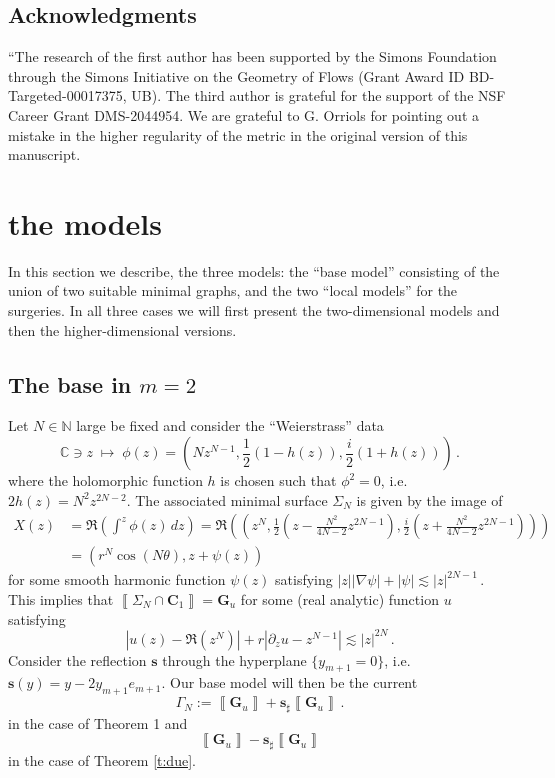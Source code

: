 \documentclass[reqno]{amsart}
\theoremstyle{definition}
\theoremstyle{remark}
\numberwithin{equation}{section}
\newcommand{\R}{\mathbb{R}}
\newcommand{\N}{\mathbb{N}}
\newcommand{\bC}{\mathbf{C}} %
\newcommand{\bG}{\mathbf{G}} %
\def\a#1{\left\llbracket{#1}\right\rrbracket}
\begin{document}
\subsection{Acknowledgments} ``The research of the first author has been supported by the Simons Foundation through the Simons Initiative on the Geometry of Flows (Grant Award ID BD-Targeted-00017375, UB). The third author is grateful for the support of the NSF Career Grant DMS-2044954. We are grateful to G. Orriols for pointing out a mistake in the higher regularity of the metric in the original version of this manuscript.


\section{the models}\label{sec.the models}
In this section we describe, the three models: the ``base model'' consisting of the union of two suitable minimal graphs, and the two ``local models'' for the surgeries. In all three cases we will first present the two-dimensional models and then the higher-dimensional versions.

\subsection{The base in $m=2$}\label{subsec.base m=2}
Let $N\in \N$ large be fixed and consider the ``Weierstrass'' data 
\[  
\mathbb C \ni z\; \mapsto\;  \phi(z)= \left(Nz^{N-1}, \frac{1}{2}( 1- h(z)), \frac{i}{2}(1+h(z))\right)\,.
\]
where the holomorphic function $h$ is chosen such that $\phi^2=0$, i.e. $2h(z)= N^2 z^{2N-2}$. The associated minimal surface $\Sigma_N$ is given by the image of 
\begin{align*}
X(z) &= \Re\left(\int^z \phi(z)\, dz \right)=\Re\left( \left(z^ N, \frac12\left(z-\frac{N^2}{4N-2}z^{2N-1}\right), \frac{i}{2}\left(z+\frac{N^2}{4N-2}z^{2N-1}\right) \right) \right)\\
&=\left(r^N\cos(N\theta), z+\psi(z)\right)
\end{align*}
for some smooth harmonic function $\psi(z)$ satisfying $|z||\nabla \psi|+|\psi|\lesssim |z|^{2N-1}$\,. 
This implies that $\a{\Sigma_N\cap \bC_{1}}= \bG_u$ for some (real analytic) function $u$ satisfying 
\begin{equation}\label{eq.base gradient}
    |u(z)- \Re\left(z^N\right)|+ r|\partial_z u - z^{N-1}|\lesssim |z|^{2N}\,.
\end{equation}
Consider the reflection $\boldsymbol{s}$ through the hyperplane $\{y_{m+1}=0\}$, i.e. $\boldsymbol{s}(y)=y- 2y_{m+1}e_{m+1}$. %
Our base model will then be the current
\[
\Gamma_N:=\a{\bG_u} +\boldsymbol{s}_\sharp \a{\bG_u}\,.
\]
in the case of Theorem 1 and 
\[
\a{\bG_u} -\boldsymbol{s}_\sharp \a{\bG_u}
\]
in the case of Theorem \ref{t:due}.
  
\end{document}
